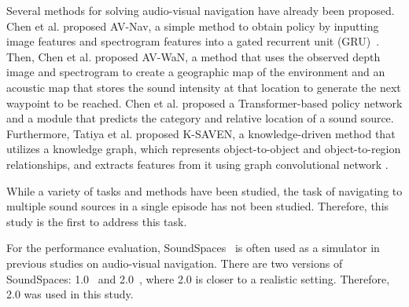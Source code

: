 Several methods for solving audio-visual navigation have already been proposed.
Chen et al. \cite{chen2020soundspaces} proposed AV-Nav, a simple method to obtain policy by inputting image features and spectrogram features into a gated recurrent unit (GRU)~\cite{chung2014empirical}. 
Then, Chen et al. \cite{chen2020learning} proposed AV-WaN, a method that uses the observed depth image and spectrogram to create a geographic map of the environment and an acoustic map that stores the sound intensity at that location to generate the next waypoint to be reached. 
Chen et al. \cite{chen2021semantic} proposed a Transformer-based policy network and a module that predicts the category and relative location of a sound source.
Furthermore, Tatiya et al. \cite{tatiya2022knowledge} proposed K-SAVEN, a knowledge-driven method that utilizes a knowledge graph, which represents object-to-object and object-to-region relationships, and extracts features from it using graph convolutional network \cite{kipf2017semisupervised}.

While a variety of tasks and methods have been studied, the task of navigating to multiple sound sources in a single episode has not been studied.
Therefore, this study is the first to address this task.

For the performance evaluation, SoundSpaces~\cite{chen2020soundspaces, chen2022soundspaces} is often used as a simulator in previous studies on audio-visual navigation.
There are two versions of SoundSpaces: 1.0~\cite{chen2020soundspaces} and 2.0~\cite{chen2022soundspaces}, where 
2.0 is closer to a realistic setting.
Therefore, 2.0 was used in this study.


